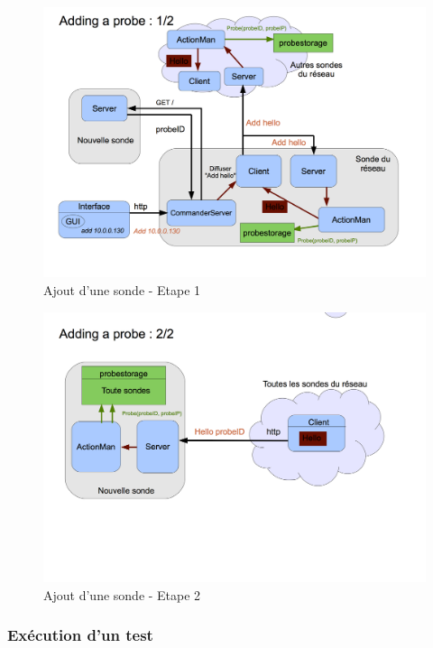 \documentclass[a4paper,11pt]{article}
\begin{document}
\begin{figure}[!ht]
\centering\includegraphics[width=\linewidth]{img/graphAdd1.png}
\caption{Ajout d'une sonde - Etape 1}
\end{figure}




\begin{figure}[!ht]
\centering\includegraphics[width=\linewidth]{img/graphAdd2.png}
\caption{Ajout d'une sonde - Etape 2}
\end{figure}


\subsubsection{Exécution d'un test}
\end{document}
